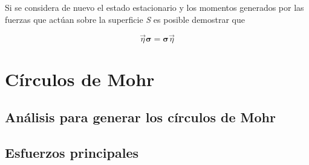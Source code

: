 \documentclass{article}
\begin{document}
    Si se considera de nuevo el estado estacionario y los momentos generados por las fuerzas
    que act\'{u}an sobre la superficie \textit{S} es posible demostrar que

    \begin{equation}
        \vec{\eta}\bm{\sigma} = \bm{\sigma}\vec{\eta}
    \end{equation}


    \section{Círculos de Mohr}
    \subsection{An\'{a}lisis para generar los círculos de Mohr}
    \subsection{Esfuerzos principales}
\end{document}

